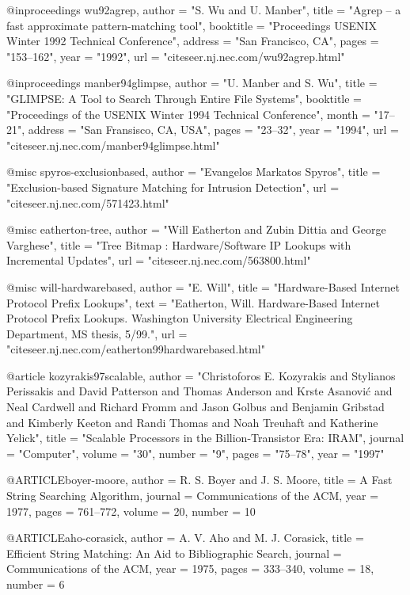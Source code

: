 @inproceedings{ wu92agrep,
    author = "S. Wu and U. Manber",
    title = "Agrep -- a fast approximate pattern-matching tool",
    booktitle = "Proceedings {USENIX} Winter 1992 Technical Conference",
    address = "San Francisco, CA",
    pages = "153--162",
    year = "1992",
    url = "citeseer.nj.nec.com/wu92agrep.html" }

@inproceedings{ manber94glimpse,
    author = "U. Manber and S. Wu",
    title = "{GLIMPSE}: {A} Tool to Search Through Entire File Systems",
    booktitle = "Proceedings of the {USENIX} Winter 1994 Technical Conference",
    month = "17--21",
    address = "San Fransisco, CA, USA",
    pages = "23--32",
    year = "1994",
    url = "citeseer.nj.nec.com/manber94glimpse.html" }

@misc{ spyros-exclusionbased,
  author = "Evangelos Markatos Spyros",
  title = "Exclusion-based Signature Matching for Intrusion Detection",
  url = "citeseer.nj.nec.com/571423.html" }

@misc{ eatherton-tree,
  author = "Will Eatherton and Zubin Dittia and George Varghese",
  title = "Tree Bitmap : Hardware/Software IP Lookups with Incremental Updates",
  url = "citeseer.nj.nec.com/563800.html" }

@misc{ will-hardwarebased,
  author = "E. Will",
  title = "Hardware-Based Internet Protocol Prefix Lookups",
  text = "Eatherton, Will. Hardware-Based Internet Protocol Prefix Lookups. Washington
    University Electrical Engineering Department, MS thesis, 5/99.",
  url = "citeseer.nj.nec.com/eatherton99hardwarebased.html" }

@article{ kozyrakis97scalable,
    author = "Christoforos E. Kozyrakis and Stylianos Perissakis and David Patterson and Thomas Anderson and Krste Asanovi{\'{c}} and Neal Cardwell and Richard Fromm and Jason Golbus and Benjamin Gribstad and Kimberly Keeton and Randi Thomas and Noah Treuhaft and Katherine Yelick",
    title = "Scalable Processors in the Billion-Transistor Era: {IRAM}",
    journal = "Computer",
    volume = "30",
    number = "9",
    pages = "75--78",
    year = "1997"}

@ARTICLE{boyer-moore,
  author =       {R. S. Boyer and J. S. Moore},
  title =        {A Fast String Searching Algorithm},
  journal =      {Communications of the ACM},
  year =         1977,
  pages =        {761--772},
  volume = 	 20,
  number = 	 10
}

@ARTICLE{aho-corasick,
  author =       {A. V. Aho and M. J. Corasick},
  title =        {Efficient String Matching: An Aid to Bibliographic Search},
  journal =      {Communications of the ACM},
  year =         1975,
  pages =        {333--340},
  volume = 	 18,
  number = 	 6
}

